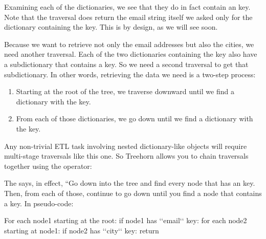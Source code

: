\documentclass[letterpaper,10pt,english]{sphinxmanual}
\begin{document}
Examining each of the dictionaries, we see that they do in fact contain an  key. Note that the traversal does  return the email string itself \textendash{} we asked only for the dictionary containing the key. This is by design, as we will see soon.

Because we want to retrieve not only the email addresses but also the cities, we need another traversal. Each of the two dictionaries containing the  key also have a subdictionary that contains a  key. So we need a second traversal to get that subdictionary. In other words, retrieving the data we need is a two-step process:
\begin{enumerate}
\def\theenumi{\arabic{enumi}}
\def\labelenumi{\theenumi .}
\makeatletter\def\p@enumii{\p@enumi \theenumi .}\makeatother
\item {} 
Starting at the root of the tree, we traverse downward until we find a dictionary with the  key.

\item {} 
From each of those dictionaries, we go down until we find a dictionary with the  key.

\end{enumerate}

Any non-trivial ETL task involving nested dictionary-like objects will require multi-stage traversals like this one. So Treehorn allows you to chain traversals together using the \sphinxcode{\sphinxupquote{\textgreater{}}} operator:

%
\begin{sphinxVerbatim}[commandchars=\\\{\}]
    
\end{sphinxVerbatim}

The  says, in effect, “Go down into the tree and find every node that has an  key. Then, from each of those, continue to go down until you find a node that contains a  key. In pseudo-code:

%
\begin{sphinxVerbatim}[commandchars=\\\{\}]
For each node\PYGZus{}1 starting at the root:
    if node\PYGZus{}1 has {}`{}`email{}`{}` key:
        for each node\PYGZus{}2 starting at node\PYGZus{}1:
            if node\PYGZus{}2 has {}`{}`city{}`{}` key:
                return
\end{sphinxVerbatim}
\end{document}
